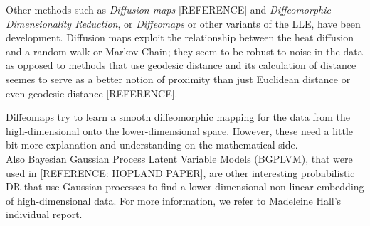 \documentclass[journal, a4paper]{IEEEtran}
\begin{document}
Other methods such as \textit{Diffusion maps} [REFERENCE] and \textit{Diffeomorphic Dimensionality Reduction}, or \textit{Diffeomaps} or other variants of the LLE, have been development. 
Diffusion maps exploit the relationship between the heat diffusion and a random walk or Markov Chain; 
they seem to be robust to noise in the data as opposed to methods that use geodesic distance and its calculation of distance seemes to serve as a better notion of proximity than just Euclidean distance or even geodesic distance [REFERENCE].

Diffeomaps try to learn a smooth diffeomorphic mapping for the data from the high-dimensional onto the lower-dimensional space. However, these need a little bit more explanation and understanding on the mathematical side. \\

Also Bayesian Gaussian Process Latent Variable Models (BGPLVM), that were used in [REFERENCE: HOPLAND PAPER], are other interesting probabilistic DR that use Gaussian processes to find a lower-dimensional non-linear embedding of high-dimensional data. For more information, we refer to Madeleine Hall's individual report.


\end{document}

